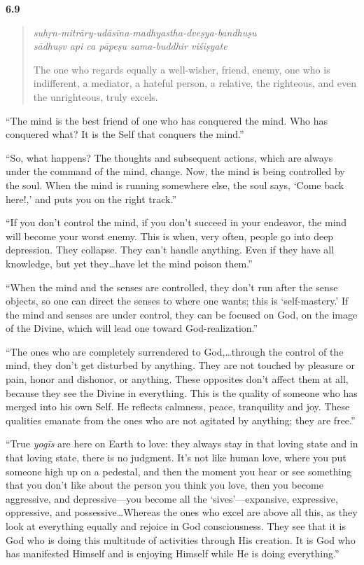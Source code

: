 \par\noindent\textbf{6.9}\par
\begin{verse}
\textit{suhṛn-mitrāry-udāsīna-madhyastha-dveṣya-bandhuṣu} \\
\textit{sādhuṣv api ca pāpeṣu sama-buddhir viśiṣyate}

\noindent The one who regards equally a well-wisher, friend, enemy, one who is indifferent, a mediator, a hateful person, a relative, the righteous, and even the unrighteous, truly excels.
\end{verse}
\par


\enquote{The mind is the best friend of one who has conquered the mind. Who has conquered what? It is the Self that conquers the mind.}

\enquote{So, what happens? The thoughts and subsequent actions, which are always under the command of the mind, change. Now, the mind is being controlled by the soul. When the mind is running somewhere else, the soul says, \enquote{Come back here!,} and puts you on the right track.}

\enquote{If you don’t control the mind, if you don’t succeed in your endeavor, the mind will become your worst enemy. This is when, very often, people go into deep depression. They collapse. They can’t handle anything. Even if they have all knowledge, but yet they\ldots have let the mind poison them.}

\enquote{When the mind and the senses are controlled, they don’t run after the sense objects, so one can direct the senses to where one wants; this is \enquote{self-mastery.} If the mind and senses are under control, they can be focused on God, on the image of the Divine, which will lead one toward God-realization.}

\enquote{The ones who are completely surrendered to God,\ldots through the control of the mind, they don’t get disturbed by anything. They are not touched by pleasure or pain, honor and dishonor, or anything. These opposites don’t affect them at all, because they see the Divine in everything. This is the quality of someone who has merged into his own Self. He reflects calmness, peace, tranquility and joy. These qualities emanate from the ones who are not agitated by anything; they are free.}

\enquote{True \textit{yogīs} are here on Earth to love: they always stay in that loving state and in that loving state, there is no judgment. It’s not like human love, where you put someone high up on a pedestal, and then the moment you hear or see something that you don’t like about the person you think you love, then you become aggressive, and depressive---you become all the \enquote{sives}---expansive, expressive, oppressive, and possessive\ldots Whereas the ones who excel are above all this, as they look at everything equally and rejoice in God consciousness. They see that it is God who is doing this multitude of activities through His creation. It is God who has manifested Himself and is enjoying Himself while He is doing everything.}

